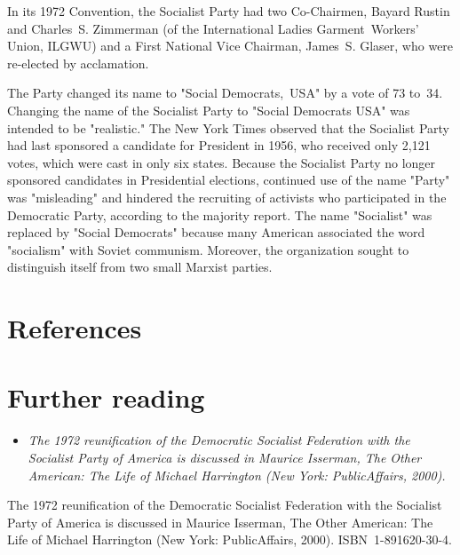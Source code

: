 In its 1972 Convention, the Socialist Party had two Co-Chairmen, Bayard
Rustin and Charles~S. Zimmerman (of the International Ladies
Garment~Workers' Union, ILGWU) and a First National Vice Chairman,
James~S. Glaser, who were re-elected by acclamation.

The Party changed its name to "Social Democrats,~USA" by a vote of 73
to~34. Changing the name of the Socialist Party to "Social Democrats
USA" was intended to be "realistic." The New York Times observed that
the Socialist Party had last sponsored a candidate for President in
1956, who received only 2,121 votes, which were cast in only six states.
Because the Socialist Party no longer sponsored candidates in
Presidential elections, continued use of the name "Party" was
"misleading" and hindered the recruiting of activists who participated
in the Democratic Party, according to the majority report. The name
"Socialist" was replaced by "Social Democrats" because many American
associated the word "socialism" with Soviet communism. Moreover, the
organization sought to distinguish itself from two small Marxist
parties.

\section{References}\label{references}

\section{Further reading}\label{further-reading}

\begin{itemize}
\item
  \emph{The 1972 reunification of the Democratic Socialist Federation
  with the Socialist Party of America is discussed in Maurice Isserman,
  The Other American: The Life of Michael Harrington (New York:
  PublicAffairs, 2000).}
\end{itemize}

The 1972 reunification of the Democratic Socialist Federation with the
Socialist Party of America is discussed in Maurice Isserman, The Other
American: The Life of Michael Harrington (New York: PublicAffairs,
2000). ISBN~1-891620-30-4.
